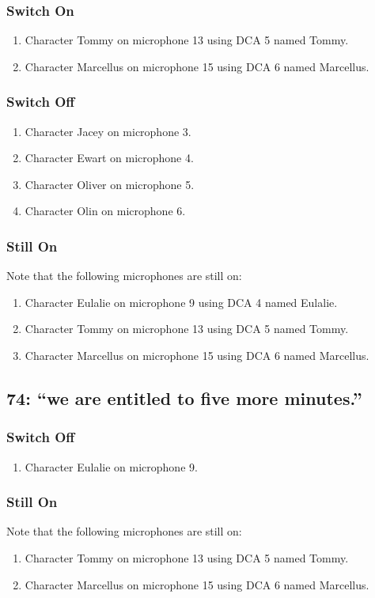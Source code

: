 \subsubsection* {Switch On}
\begin{enumerate}
\item Character Tommy on microphone 13 using DCA 5 named Tommy.
\item Character Marcellus on microphone 15 using DCA 6 named Marcellus.
\end{enumerate}
\subsubsection* {Switch Off}
\begin{enumerate}
\item Character Jacey on microphone 3.
\item Character Ewart on microphone 4.
\item Character Oliver on microphone 5.
\item Character Olin on microphone 6.
\end{enumerate}
\subsubsection* {Still On}
Note that the following microphones are still on:
\begin{enumerate}
\item Character Eulalie on microphone 9 using DCA 4 named Eulalie.
\item Character Tommy on microphone 13 using DCA 5 named Tommy.
\item Character Marcellus on microphone 15 using DCA 6 named Marcellus.
\end{enumerate}
\subsection* {74: ``we are entitled to five more minutes.''}
\subsubsection* {Switch Off}
\begin{enumerate}
\item Character Eulalie on microphone 9.
\end{enumerate}
\subsubsection* {Still On}
Note that the following microphones are still on:
\begin{enumerate}
\item Character Tommy on microphone 13 using DCA 5 named Tommy.
\item Character Marcellus on microphone 15 using DCA 6 named Marcellus.
\end{enumerate}
